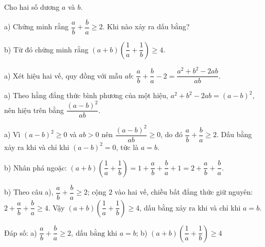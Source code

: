 \begin{problem}[9DS-BPT-043]
Cho hai số dương $a$ và $b$.

a) Chứng minh rằng $\dfrac{a}{b} + \dfrac{b}{a} \geq 2$. Khi nào xảy ra dấu bằng?

b) Từ đó chứng minh rằng $(a + b)\left(\dfrac{1}{a} + \dfrac{1}{b}\right) \geq 4$.

\begin{solution}
a) Xét hiệu hai vế, quy đồng với mẫu $ab$: $\dfrac{a}{b} + \dfrac{b}{a} - 2 = \dfrac{a^2 + b^2 - 2ab}{ab}$.

a) Theo hằng đẳng thức bình phương của một hiệu, $a^2 + b^2 - 2ab = (a - b)^2$, nên hiệu trên bằng $\dfrac{(a - b)^2}{ab}$.

a) Vì $(a - b)^2 \geq 0$ và $ab > 0$ nên $\dfrac{(a - b)^2}{ab} \geq 0$, do đó $\dfrac{a}{b} + \dfrac{b}{a} \geq 2$. Dấu bằng xảy ra khi và chỉ khi $(a - b)^2 = 0$, tức là $a = b$.

b) Nhân phá ngoặc: $(a + b)\left(\dfrac{1}{a} + \dfrac{1}{b}\right) = 1 + \dfrac{a}{b} + \dfrac{b}{a} + 1 = 2 + \dfrac{a}{b} + \dfrac{b}{a}$.

b) Theo câu a), $\dfrac{a}{b} + \dfrac{b}{a} \geq 2$; cộng $2$ vào hai vế, chiều bất đẳng thức giữ nguyên: $2 + \dfrac{a}{b} + \dfrac{b}{a} \geq 4$. Vậy $(a + b)\left(\dfrac{1}{a} + \dfrac{1}{b}\right) \geq 4$, dấu bằng xảy ra khi và chỉ khi $a = b$.

Đáp số: a) $\boxed{\dfrac{a}{b} + \dfrac{b}{a} \geq 2,\ \text{dấu bằng khi } a = b}$; b) $\boxed{(a + b)\left(\dfrac{1}{a} + \dfrac{1}{b}\right) \geq 4}$
\end{solution}
\end{problem}

